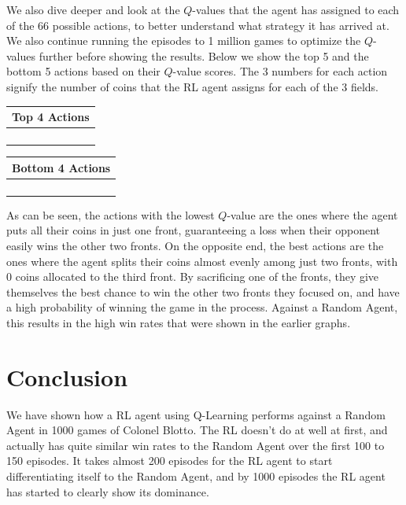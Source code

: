 \documentclass[11pt, oneside]{article}   	%
\begin{document}
We also dive deeper and look at the $Q$-values that the agent has assigned to each of the 66 possible actions, to better understand what strategy it has arrived at. We also continue running the episodes to 1 million games to optimize the $Q$-values further before showing the results. Below we show the top 5 and the bottom 5 actions based on their $Q$-value scores. The 3 numbers for each action signify the number of coins that the RL agent assigns for each of the 3 fields.

\hfill

\begin{center}
\begin{tabular}{ |c| } 
 \hline
 \textbf{Top 4 Actions} \\ 
 \hline
 [4, 0, 6] \\ 
 \hline
 [5, 0, 5] \\ 
 \hline
 [0, 4, 6] \\
 \hline
 [6, 1, 3] \\

 \hline
\end{tabular}
\quad
\begin{tabular}{ |c| } 
 \hline
\textbf{Bottom 4 Actions} \\ 
 \hline
 [0, 0, 10] \\ 
 \hline
[0, 8, 2] \\
 \hline
 [0, 10, 0] \\
 \hline
 [10, 0, 0] \\
 \hline
\end{tabular}
\end{center}

As can be seen, the actions with the lowest $Q$-value are the ones where the agent puts all their coins in just one front, guaranteeing a loss when their opponent easily wins the other two fronts. On the opposite end, the best actions are the ones where the agent splits their coins almost evenly among just two fronts, with 0 coins allocated to the third front. By sacrificing one of the fronts, they give themselves the best chance to win the other two fronts they focused on, and have a high probability of winning the game in the process. Against a Random Agent, this results in the high win rates that were shown in the earlier graphs.

\section{Conclusion}

We have shown how a RL agent using Q-Learning performs against a Random Agent in 1000 games of Colonel Blotto. The RL doesn't do at well at first, and actually has quite similar win rates to the Random Agent over the first 100 to 150 episodes. It takes almost 200 episodes for the RL agent to start differentiating itself to the Random Agent, and by 1000 episodes the RL agent has started to clearly show its dominance.
\end{document}

